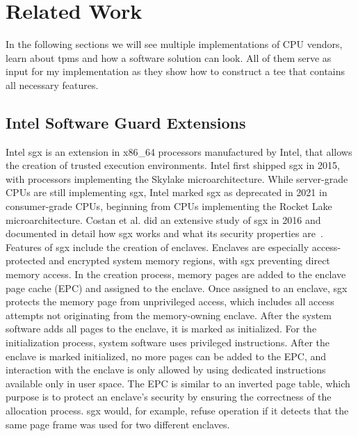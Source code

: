 \chapter{Related Work}
\label{chap:related}

In the following sections we will see multiple implementations of CPU vendors,
learn about \glspl{tpm} and how a software solution can look. All of them serve
as input for my implementation as they show how to construct a \gls{tee} that
contains all necessary features.

\section{Intel Software Guard Extensions}
\label{sec:20:sgx}
Intel \gls{sgx} is an extension in x86\_64 processors manufactured by Intel,
that allows the creation of trusted execution environments. Intel first shipped
\gls{sgx} in 2015, with processors implementing the Skylake microarchitecture.
While server-grade CPUs are still implementing \gls{sgx}, Intel marked \gls{sgx}
as deprecated in 2021 in consumer-grade CPUs, beginning from CPUs implementing
the Rocket Lake microarchitecture. Costan et al. did an extensive study of
\gls{sgx} in 2016 and documented in detail how \gls{sgx} works and what its
security properties are~\cite{costan2016intel}. \\

Features of \gls{sgx} include the creation of enclaves. Enclaves are especially
access-protected and encrypted system memory regions, with \gls{sgx} preventing
direct memory access. In the creation process, memory pages are added to the
enclave page cache (EPC) and assigned to the enclave. Once assigned to an
enclave, \gls{sgx} protects the memory page from unprivileged access, which
includes all access attempts not originating from the memory-owning enclave.
After the system software adds all pages to the enclave, it is marked as
initialized. For the initialization process, system software uses privileged
instructions. After the enclave is marked initialized, no more pages can be
added to the EPC, and interaction with the enclave is only allowed by using
dedicated instructions available only in user space. The EPC is similar to an
inverted page table, which purpose is to protect an enclave's security by
ensuring the correctness of the allocation process. \gls{sgx} would, for
example, refuse operation if it detects that the same page frame was used for
two different enclaves.\\

